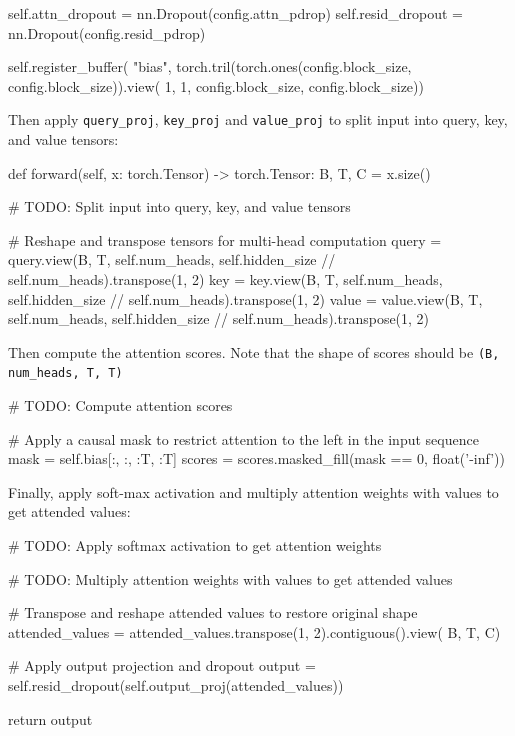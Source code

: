 \begin{exercise}
\begin{enumerate}
\begin{python}
        self.attn_dropout = nn.Dropout(config.attn_pdrop)
        self.resid_dropout = nn.Dropout(config.resid_pdrop)

        self.register_buffer(
            "bias",
            torch.tril(torch.ones(config.block_size, config.block_size)).view(
                1, 1, config.block_size, config.block_size))
\end{python}
Then apply {\tt query\_proj}, {\tt key\_proj} and {\tt value\_proj} to split input into query, key, and value tensors:
\begin{python}
    def forward(self, x: torch.Tensor) -> torch.Tensor:
        B, T, C = x.size()

        # TODO: Split input into query, key, and value tensors

        # Reshape and transpose tensors for multi-head computation
        query = query.view(B, T, self.num_heads,
                           self.hidden_size // self.num_heads).transpose(1, 2)
        key = key.view(B, T, self.num_heads,
                       self.hidden_size // self.num_heads).transpose(1, 2)
        value = value.view(B, T, self.num_heads,
                           self.hidden_size // self.num_heads).transpose(1, 2)
\end{python}
Then compute the attention scores. Note that the shape of scores should be {\tt (B, num\_heads, T, T)}
\begin{python}
        # TODO: Compute attention scores

        # Apply a causal mask to restrict attention to the left in the input sequence
        mask = self.bias[:, :, :T, :T]
        scores = scores.masked_fill(mask == 0, float('-inf'))
\end{python}
Finally, apply soft-max activation and multiply attention weights with values to get attended values:
\begin{python}
        # TODO: Apply softmax activation to get attention weights

        # TODO: Multiply attention weights with values to get attended values

        # Transpose and reshape attended values to restore original shape
        attended_values = attended_values.transpose(1, 2).contiguous().view(
            B, T, C)

        # Apply output projection and dropout
        output = self.resid_dropout(self.output_proj(attended_values))

        return output
\end{python}
\end{enumerate}
\end{exercise}

